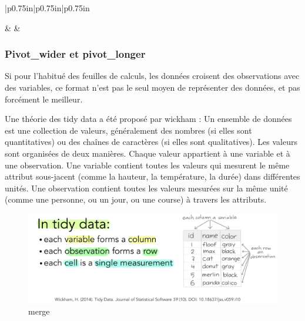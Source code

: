 \documentclass[
]{book}
\begin{document}
\begin{longtable}[c]{|p{0.75in}|p{0.75in}|p{0.75in}}
\noalign{\global\setlength{\arrayrulewidth}{0.5pt}}



 &  &  \\

\noalign{\global\setlength{\arrayrulewidth}{2pt}}



\end{longtable}

\hypertarget{pivot_wider-et-pivot_longer}{%
\subsubsection{Pivot\_wider et pivot\_longer}\label{pivot_wider-et-pivot_longer}}

Si pour l'habitué des feuilles de calculs, les données croisent des observations avec des variables, ce format n'est pas le seul moyen de représenter des données, et pas forcément le meilleur.

Une théorie des tidy data a été proposé par wickham : Un ensemble de données est une collection de valeurs, généralement des nombres (si elles sont quantitatives) ou des chaînes de caractères (si elles sont qualitatives). Les valeurs sont organisées de deux manières. Chaque valeur appartient à une variable et à une observation. Une variable contient toutes les valeurs qui mesurent le même attribut sous-jacent (comme la hauteur, la température, la durée) dans différentes unités. Une observation contient toutes les valeurs mesurées sur la même unité (comme une personne, ou un jour, ou une course) à travers les attributs.

\begin{figure}
\centering
\includegraphics{./Images/tidydata_1.jpg}
\caption{merge}
\end{figure}
\end{document}

